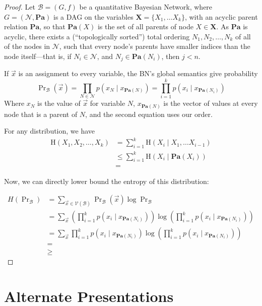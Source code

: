 \documentclass{article}
\newcommand{\V}{\mathcal V}
\newcommand{\N}{\mathcal N}
\numberwithin{equation}{section}
\begin{document}
	\thmbnsRpdgs*
	\begin{proof}
		\def\Pa{\mathbf{Pa}}
		\def\H{\mathrm{H}}
		Let $\mathcal B = (G, f)$ be a quantitative Bayesian Network, where $G = (\N, \Pa)$ is a DAG on the variables $\mathbf X = \{ X_1, \ldots X_k\}$, with an acyclic parent relation $\Pa$, so that $\Pa(X)$ is the set of all parents of node $X \in \mathbf X$. As $\Pa$ is acyclic, there exists a (``topologically sorted'') total ordering $N_1, N_2, \ldots, N_k$ of all of the nodes in $\N$, such that every node's parents have smaller indices than the node itself---that is, if $N_i \in \N$, and $N_j \in \Pa(N_i)$, then $j < n$.
		
		If $\vec x$ is an assignment to every variable, the BN's global semantics give probability 
		\[ \Pr\nolimits_{\mathcal B}(\vec x) = \prod_{N \in \N} p(x_{N} \mid x_{\Pa(N)})  
			 = \prod_{i=1}^k p(x_{i} \mid x_{\Pa(N_i)}) 
		\]
		Where $x_N$ is the value of $\vec x$ for variable $N$, $x_{\Pa(N)}$ is the vector of values at every node that is a parent of $N$, and the second equation uses our order. 
		
		
		For any distribution, we have
		\[  \]
		\begin{align*}
			\H(X_1, X_2, \ldots, X_k)  &= \sum_{i =1}^k \H(X_i \mid X_1, \ldots X_{i-1}) \\
				&\leq \sum_{i = 1}^k \H(X_i \mid \Pa(X_i)) \\
				&= 
		\end{align*}
	
		
		Now, we can directly lower bound the entropy of this distribution:
		
		\begin{align*}
			H(\Pr\nolimits_{\mathcal B}) &= \sum_{\vec x \in \V(\mathcal B)} \Pr\nolimits_{\mathcal B} (\vec x) \log \Pr\nolimits_{\mathcal B} \\
				&= \sum_{\vec x} \left(\prod_{i=1}^k p(x_{i} \mid x_{\Pa(N_i)})\right)  \log \left(\prod_{i=1}^k p(x_{i} \mid x_{\Pa(N_i)}) \right) \\
				&= \sum_{\vec x} \prod_{i=1}^k p(x_{i} \mid x_{\Pa(N_i)})  \log \left(\prod_{i=1}^k p(x_{i} \mid x_{\Pa(N_i)}) \right) \\
				&= \\
				&\geq
		\end{align*}
	\end{proof}


	


	\section{Alternate Presentations}
\end{document}
